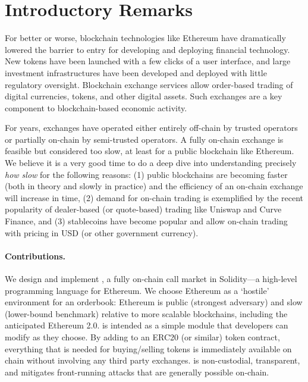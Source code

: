 
\section{Introductory Remarks}

For better or worse, blockchain technologies like Ethereum have dramatically lowered the barrier to entry for developing and deploying financial technology. New tokens have been launched with a few clicks of a user interface, and large investment infrastructures have been developed and deployed with little regulatory oversight. Blockchain exchange services allow order-based trading of digital currencies, tokens, and other digital assets. Such exchanges are a key component to blockchain-based economic activity. 

For years, exchanges have operated either entirely off-chain by trusted operators or partially on-chain by semi-trusted operators. A fully on-chain exchange is feasible but considered too slow, at least for a public blockchain like Ethereum. We believe it is a very good time to do a deep dive into understanding precisely \textit{how slow} for the following reasons: (1) public blockchains are becoming faster (both in theory and slowly in practice) and the efficiency of an on-chain exchange will increase in time, (2) demand for on-chain trading is exemplified by the recent popularity of dealer-based (or quote-based) trading like Uniswap and Curve Finance, and (3) stablecoins have become popular and allow on-chain trading with pricing in USD (or other government currency).

\paragraph{Contributions.} We design and implement \cm, a fully on-chain call market in Solidity---a high-level programming language for Ethereum. We choose Ethereum as a `hostile' environment for an orderbook: Ethereum is public (strongest adversary) and slow (lower-bound benchmark) relative to more scalable blockchains, including the anticipated Ethereum 2.0. \cm is intended as a simple module that developers can modify as they choose. By adding \cm to an ERC20 (or similar) token contract, everything that is needed for buying/selling tokens is immediately available on chain without involving any third party exchanges. \cm is non-custodial, transparent, and mitigates front-running attacks that are generally possible on-chain.

